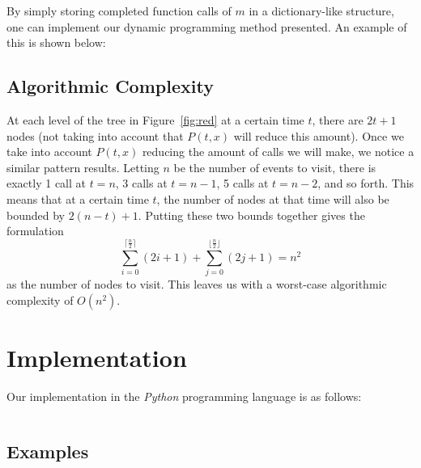 \documentclass[titlepage,12pt]{article}
\begin{document}
By simply storing completed function calls of $m$ in a dictionary-like
structure, one can implement our dynamic programming method presented. An
example of this is shown below:

\begin{algorithm}
\begin{algorithmic}
    \Else
    \EndIf
    \EndFunction
\end{algorithmic}
\end{algorithm}

\subsection{Algorithmic Complexity}

At each level of the tree in Figure~\ref{fig:red} at a certain time $t$, there
are $2t + 1$ nodes (not taking into account that $P(t, x)$ will reduce this
amount). Once we take into account $P(t, x)$ reducing the amount of calls we
will make, we notice a similar pattern results. Letting $n$ be the number of
events to visit, there is exactly 1 call at $t = n$, 3 calls at $t = n -1$, 5
calls at $t = n - 2$, and so forth. This means that at a certain time $t$, the
number of nodes at that time will also be bounded by $2(n - t) + 1$. Putting
these two bounds together gives the formulation
\begin{displaymath}
    \sum_{i=0}^{\lceil \frac{n}{2} \rceil} (2i + 1) +
    \sum_{j=0}^{\lfloor \frac{n}{2} \rfloor} (2j + 1) = n^2
\end{displaymath}
as the number of nodes to visit. This leaves us with a worst-case algorithmic
complexity of $O(n^2)$.

\section{Implementation}

Our implementation in the \emph{Python} programming language is as follows:

\inputminted{python3}{dp.py}

\subsection{Examples}


\end{document}
